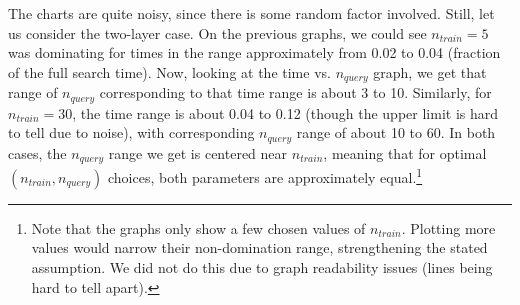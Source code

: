 The charts are quite noisy, since there is some random factor involved. Still,
let us consider the two-layer case. On the previous graphs, we could see 
$n_{train} = 5$ was dominating for times in the range approximately from 0.02 to 
0.04 (fraction of the full search time). Now, looking at the time vs. $n_{query}$ graph,
we get that range of $n_{query}$ corresponding to that time range is about
3 to 10. Similarly, for $n_{train} = 30$, the time range is about 0.04 to 0.12
(though the upper limit is hard to tell due to noise), with corresponding
$n_{query}$ range of about 10 to 60. In both cases, the $n_{query}$ range we
get is centered near $n_{train}$, meaning that for optimal 
$(n_{train}, n_{query})$ choices, both parameters are approximately 
equal.\footnote{
Note that the graphs only show a few chosen values of $n_{train}$. Plotting
more values would narrow their non-domination range, strengthening the 
stated assumption. We did not do this due to graph readability issues
(lines being hard to tell apart).
}
